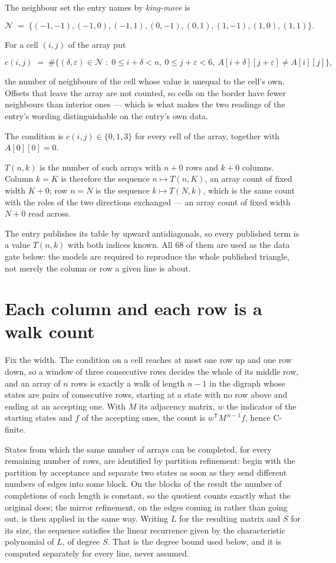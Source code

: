 \documentclass[11pt]{article}
\theoremstyle{definition}
\begin{document}
The neighbour set the entry names by {\itshape king-move} is

\[\mathcal{N} \;=\; \{(-1,-1), (-1,0), (-1,1), (0,-1), (0,1), (1,-1), (1,0), (1,1)\}.\]

For a cell $(i,j)$ of the array put

\[c(i,j) \;=\; \#\bigl\{(\delta,\varepsilon)\in\mathcal{N} \;:\; 0\le i+\delta<n,\ 0\le j+\varepsilon<6,\ A[i+\delta][j+\varepsilon] \neq A[i][j]\bigr\},\]

the number of neighbours of the cell whose value is unequal to the cell's own. Offsets that leave the array are not counted, so cells on the border have fewer neighbours than interior ones --- which is what makes the two readings of the entry's wording distinguishable on the entry's own data.

The condition is $c(i,j) \in \{0, 1, 3\}$ for every cell of the array, together with $A[0][0]=0$.

$T(n,k)$ is the number of such arrays with $n + 0$ rows and $k + 0$ columns. Column $k = K$ is therefore the sequence $n \mapsto T(n,K)$, an array count of fixed width $K + 0$; row $n = N$ is the sequence $k \mapsto T(N,k)$, which is the same count with the roles of the two directions exchanged --- an array count of fixed width $N + 0$ read across.

The entry publishes its table by upward antidiagonals, so every published term is a value $T(n,k)$ with both indices known. All 68 of them are used as the data gate below: the models are required to reproduce the whole published triangle, not merely the column or row a given line is about.

\section{Each column and each row is a walk count}

Fix the width. The condition on a cell reaches at most one row up and one row down, so a window of three consecutive rows decides the whole of its middle row, and an array of $n$ rows is exactly a walk of length $n-1$ in the digraph whose states are pairs of consecutive rows, starting at a state with no row above and ending at an accepting one. With $M$ its adjacency matrix, $w$ the indicator of the starting states and $f$ of the accepting ones, the count is $w^{\mathsf T}M^{\,n-1}f$, hence C-finite.

States from which the same number of arrays can be completed, for every remaining number of rows, are identified by partition refinement: begin with the partition by acceptance and separate two states as soon as they send different numbers of edges into some block. On the blocks of the result the number of completions of each length is constant, so the quotient counts exactly what the original does; the mirror refinement, on the edges coming in rather than going out, is then applied in the same way. Writing $L$ for the resulting matrix and $S$ for its size, the sequence satisfies the linear recurrence given by the characteristic polynomial of $L$, of degree $S$. That is the degree bound used below, and it is computed separately for every line, never assumed.
\end{document}
